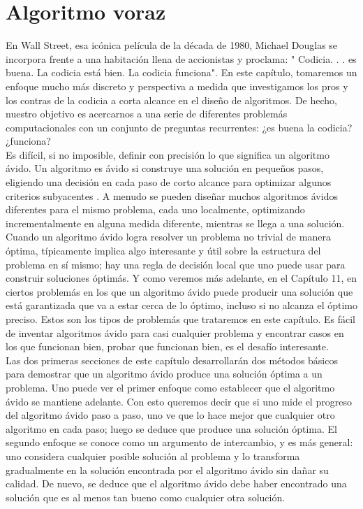 \documentclass[a4paper]{article}
\begin{document}
\newpage

\section{Algoritmo voraz}


En Wall Street, esa icónica película de la década de 1980, Michael Douglas se incorpora
frente a una habitación llena de accionistas y proclama: " Codicia. . . es buena. La codicia
está bien. La codicia funciona". En este capítulo, tomaremos un enfoque mucho más discreto y perspectiva a medida que investigamos los pros y los contras de la codicia a corta alcance en el diseño de algoritmos. De hecho, nuestro objetivo es acercarnos a una serie de diferentes problemás computacionales con un conjunto de preguntas recurrentes: ¿es buena la codicia? ¿funciona?\\

Es difícil, si no imposible, definir con precisión lo que significa un algoritmo ávido. Un algoritmo es ávido si construye una solución en pequeños pasos, eligiendo una decisión en cada paso de corto alcance para optimizar algunos criterios subyacentes . A menudo se pueden diseñar muchos algoritmos ávidos diferentes para el mismo problema, cada uno localmente, optimizando incrementalmente en alguna medida diferente, mientras se llega a una solución.\\

Cuando un algoritmo ávido logra resolver un problema no trivial de manera óptima, típicamente implica algo interesante y útil sobre la estructura del problema en sí mismo; hay una regla de decisión local que uno puede usar para construir soluciones óptimás. Y como veremos más adelante, en el Capítulo 11, en ciertos problemás en los que un algoritmo ávido puede producir una solución que está garantizada que va a estar cerca de lo óptimo, incluso si no alcanza el óptimo preciso. Estos son los tipos de problemás que trataremos en este capítulo. Es fácil de inventar algoritmos ávido para casi cualquier problema y encontrar casos en los que funcionan bien, probar que funcionan bien, es el desafío interesante.\\

Las dos primeras secciones de este capítulo desarrollarán dos métodos básicos para demostrar que un algoritmo ávido produce una solución óptima a un problema. Uno puede ver el primer enfoque como establecer que el algoritmo ávido se mantiene adelante. Con esto queremos decir que si uno mide el progreso del algoritmo ávido paso a paso, uno ve que lo hace mejor que cualquier otro algoritmo en cada paso; luego se deduce que produce una solución óptima. El segundo enfoque se conoce como un argumento de intercambio, y es más general: uno considera cualquier posible solución al problema y lo transforma gradualmente en la solución encontrada por el algoritmo ávido sin dañar su calidad. De nuevo, se deduce que el algoritmo ávido debe haber encontrado una solución que es al menos tan bueno como cualquier otra solución.\\
\end{document}
